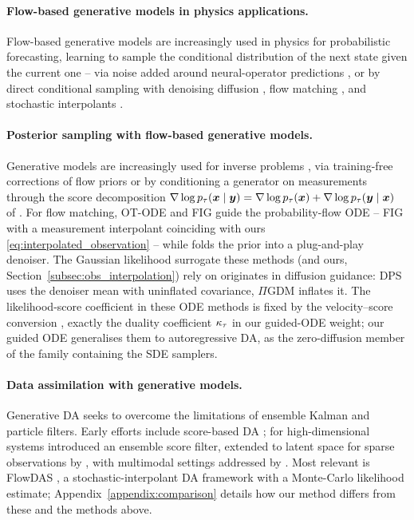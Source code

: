 
\paragraph{Flow-based generative models in physics applications.}

Flow-based generative models are increasingly used in physics for probabilistic forecasting, learning to sample the conditional distribution of the next state given the current one -- via noise added around neural-operator predictions \cite{lippe_pde-refiner_2023, gao_generative_2024}, or by direct conditional sampling with denoising diffusion \cite{kohl_benchmarking_2024}, flow matching \cite{fotiadis_stochastic_2024}, and stochastic interpolants \cite{chen_probabilistic_2024, mucke_physics-aware_2025}.

\paragraph{Posterior sampling with flow-based generative models.}
Generative models are increasingly used for inverse problems \cite{daras_survey_2024}, via training-free corrections of flow priors \cite{zhang_flow_2025, ahamed_dawn-si_2024, negrel_multitask_2025} or by conditioning a generator on measurements through the score decomposition $\nabla\log p_\tau(\boldsymbol{x}\mid\boldsymbol{y})=\nabla\log p_\tau(\boldsymbol{x})+\nabla\log p_\tau(\boldsymbol{y}\mid\boldsymbol{x})$ of \cite{song_score-based_2021}. For flow matching, OT-ODE \cite{pokle_training-free_2024} and FIG \cite{yan_fig_2024} guide the probability-flow ODE -- FIG with a measurement interpolant coinciding with ours \eqref{eq:interpolated_observation} -- while \cite{martin_pnp-flow_2025} folds the prior into a plug-and-play denoiser. The Gaussian likelihood surrogate these methods (and ours, Section~\ref{subsec:obs_interpolation}) rely on originates in diffusion guidance: DPS \cite{chung_diffusion_2023} uses the denoiser mean with uninflated covariance, $\Pi$GDM \cite{song_pseudoinverse_2023} inflates it. The likelihood-score coefficient in these ODE methods is fixed by the velocity--score conversion \cite{albergo_stochastic_2023, ma_sit_2024}, exactly the duality coefficient $\kappa_\tau$ in our guided-ODE weight; our guided ODE generalises them to autoregressive DA, as the zero-diffusion member of the family containing the SDE samplers.

\paragraph{Data assimilation with generative models.}
Generative DA seeks to overcome the limitations of ensemble Kalman and particle filters. Early efforts include score-based DA \cite{rozet_score-based_2023}; for high-dimensional systems \cite{bao_ensemble_2024} introduced an ensemble score filter, extended to latent space for sparse observations by \cite{si_latent-ensf_2024}, with multimodal settings addressed by \cite{qu_deep_2024}. Most relevant is FlowDAS \cite{chen_flowdas_2025}, a stochastic-interpolant DA framework with a Monte-Carlo likelihood estimate; Appendix~\ref{appendix:comparison} details how our method differs from these and the methods above.
